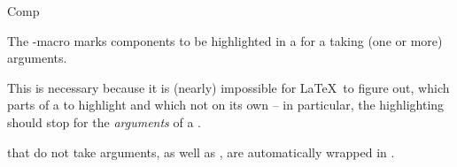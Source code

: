 \documentclass{stex}
\begin{document}
  \begin{smodule}[title=Notation Components]{Comp}

    \begin{sparagraph}[style={defibox,symdoc},name=comp]
        The -macro marks components to be highlighted in a  
        for a  taking (one or more) arguments.
    
        This is necessary because
        it is (nearly) impossible for \LaTeX\ to figure out,
        which parts of a  to highlight and which not
         on its own --
        in particular, the highlighting should stop for the 
        \emph{arguments} of a .
    
         that do not take arguments, as well as
        , are automatically wrapped in
        .
    \end{sparagraph}
    
  \end{smodule}
\end{document}
